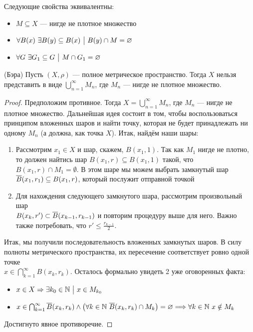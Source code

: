 \begin{proposition}
	Следующие свойства эквивалентны:
	\begin{itemize}
		\item $M \subseteq X$ --- нигде не плотное множество
		
		\item $\forall B(x)\ \exists B(y) \subseteq B(x) \ \big|\  B(y) \cap M = \varnothing$
		
		\item $\forall G\ \exists G_1 \subseteq G \ \big|\  M \cap G_1 = \varnothing$
	\end{itemize}
\end{proposition}

\begin{theorem} (Бэра)
	Пусть $(X, \rho)$ --- полное метрическое пространство. Тогда $X$ нельзя представить в виде $\bigcup_{n = 1}^\infty M_n$, где $M_n$ --- нигде не плотное множество.
\end{theorem}

\begin{proof}
	Предположим противное. Тогда $X = \bigcup_{n = 1}^\infty M_n$, где $M_n$ --- нигде не плотное множество. Дальнейшая идея состоит в том, чтобы воспользоваться принципом вложенных шаров и найти точку, которая не будет принадлежать ни одному $M_n$ (а должна, как точка $X$). Итак, найдём наши шары:
	\begin{enumerate}
		\item Рассмотрим $x_1 \in X$ и шар, скажем, $B(x_1, 1)$. Так как $M_1$ нигде не плотно, то должен найтись шар $B(x_1, r) \subseteq B(x_1, 1)$ такой, что $B(x_1, r) \cap M_1 = \emptyset$. В этом шаре мы можем выбрать замкнутый шар $\overline{B}(x_1, r_1) \subseteq B(x_1, r)$, который послужит отправной точкой
		
		\item Для нахождения следующего замкнутого шара, рассмотрим произвольный шар \\ $B(x_k, r') \subset \overline{B}(x_{k - 1}, r_{k - 1})$ и повторим процедуру выше для него. Важно также потребовать, что $r' \le \frac{r_{k - 1}}{2}$.
	\end{enumerate}
	Итак, мы получили последовательность вложенных замкнутых шаров. В силу полноты метрического пространства, их пересечение соответствует ровно одной точке \\ $x \in \bigcap_{k = 1}^\infty B(x_k, r_k)$. Осталось формально увидеть 2 уже оговоренных факта:
	\begin{itemize}
		\item $x \in X \Rightarrow \exists k_0 \in \mathbb{N} \ \big|\  x \in M_{k_0}$
		
		\item $x \in \bigcap_{k = 1}^\infty \overline{B}(x_k, r_k) \wedge \big(\forall k \in \mathbb{N}\ \overline{B}(x_k, r_k) \cap M_k\big) = \varnothing \Longrightarrow \forall k \in \mathbb{N}\ x \notin M_k$
	\end{itemize}
	Достигнуто явное противоречие.
\end{proof}

